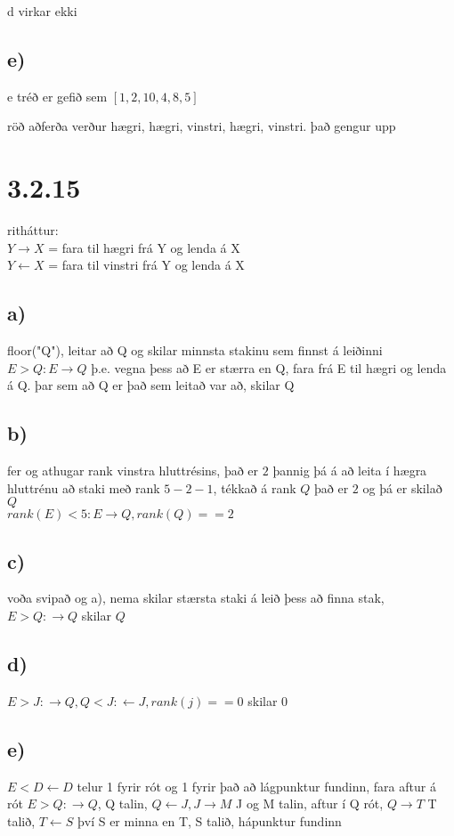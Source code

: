 \documentclass{article}
\begin{document}
d virkar ekki

\subsection*{e)}
e tréð er gefið sem $[1,2,10,4,8,5]$

röð aðferða verður hægri, hægri, vinstri, hægri, vinstri.
það gengur upp

\section*{3.2.15}
ritháttur:\\
$Y\rightarrow X$ = fara til hægri frá Y og lenda á X \\$Y\leftarrow X$ = fara til vinstri frá Y og lenda á X
\subsection*{a)}
floor("Q"), leitar að Q og skilar minnsta stakinu sem finnst á leiðinni\\
$E>Q:E\rightarrow Q$ þ.e. vegna þess að E er stærra en Q, fara frá E til hægri og lenda á Q. 
þar sem að Q er það sem leitað var að, skilar Q

\subsection*{b)}
fer og athugar rank vinstra hluttrésins, 
það er $2$ þannig þá á að leita í hægra hluttrénu að staki með rank $5-2-1$,
tékkað á rank $Q$ það er $2$ og þá er skilað $Q$\\
$rank(E)<5:E\rightarrow Q, rank(Q)==2$ 

\subsection*{c)}
voða svipað og a), nema skilar stærsta staki á leið þess að finna stak,
$E>Q:\rightarrow Q$ skilar $Q$

\subsection*{d)}
$E>J:\rightarrow Q, Q<J:\leftarrow J, rank(j)==0$ skilar $0$

\subsection*{e)}
$E<D\leftarrow D$ telur 1 fyrir rót og 1 fyrir það að lágpunktur fundinn, 
fara aftur á rót $E>Q:\rightarrow Q$, Q talin, 
$Q\leftarrow J, J\rightarrow M$ J og M talin, 
aftur í Q rót, $Q\rightarrow T$ T talið, $T\leftarrow S$ því S er minna en T, S talið, hápunktur fundinn
\end{document}
